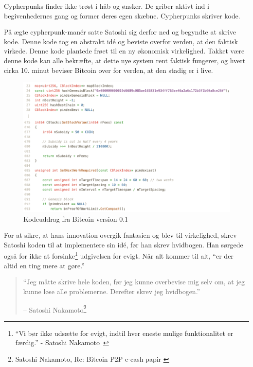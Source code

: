 \documentclass[paper=6in:9in,pagesize=pdftex,
               headinclude=on,footinclude=on,12pt]{scrbook}
\begin{document}
Cypherpunks finder ikke trøst i håb og ønsker. De griber aktivt ind i begivenhedernes gang og former deres egen skæbne. Cypherpunks skriver kode.

På ægte cypherpunk-man\'er satte Satoshi sig derfor ned og begyndte at skrive kode. Denne kode tog en abstrakt id\'e og beviste overfor verden, at den faktisk virkede. Denne kode plantede frøet til en ny økonomisk virkelighed. Takket være denne kode kan alle bekræfte, at dette nye system rent faktisk fungerer, og hvert cirka 10. minut beviser Bitcoin over for verden, at den stadig er i live.\begin{figure}
  \includegraphics{assets/images/bitcoin-code-white.png}
  \caption{Kodeuddrag fra Bitcoin version 0.1}
  \label{fig:bitcoin-code-white}
\end{figure}

For at sikre, at hans innovation overgik fantasien og blev til virkelighed, skrev Satoshi koden til at implementere sin id\'e, før han skrev hvidbogen. Han sørgede også for ikke at forsinke\footnote{\enquote{Vi bør ikke udsætte for evigt, indtil hver eneste mulige funktionalitet er færdig.} - Satoshi Nakamoto~\cite{satoshi-delay}} udgivelsen for evigt. Når alt kommer til alt, \enquote{er der altid en ting mere at gøre.}\begin{quotation}\begin{samepage} \enquote{Jeg måtte skrive hele koden, før jeg kunne overbevise mig selv om, at jeg kunne løse alle problemerne. Derefter skrev jeg hvidbogen.} \begin{flushright} -- Satoshi Nakamoto\footnote{Satoshi Nakamoto, Re: Bitcoin P2P e-cash papir \cite{satoshi-mail-code-first}}
\end{flushright}\end{samepage}\end{quotation}
\end{document}
